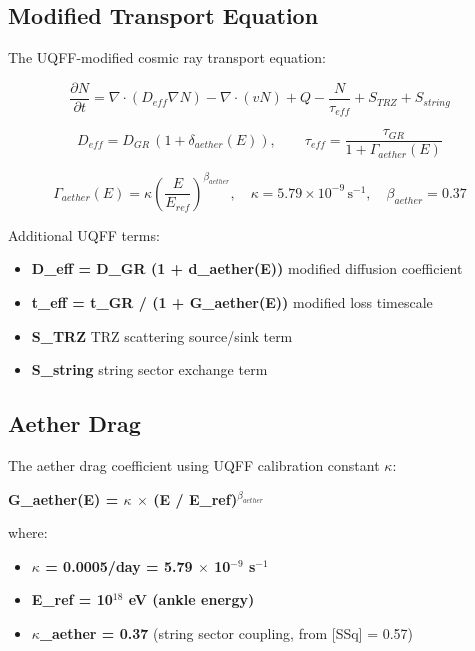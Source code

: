 \documentclass[12pt,a4paper]{article}
\begin{document}
\subsection{Modified Transport Equation}

The UQFF-modified cosmic ray transport equation:

\begin{equation}
\frac{\partial N}{\partial t} = \nabla\cdot(D_{eff}\nabla N) - \nabla\cdot(v N) + Q - \frac{N}{\tau_{eff}} + S_{TRZ} + S_{string}
\end{equation}

\begin{equation}
D_{eff} = D_{GR}\,(1 + \delta_{aether}(E)), \qquad \tau_{eff} = \frac{\tau_{GR}}{1 + \Gamma_{aether}(E)}
\end{equation}

\begin{equation}
\Gamma_{aether}(E) = \kappa \left(\frac{E}{E_{ref}}\right)^{\beta_{aether}},\quad \kappa = 5.79\times10^{-9}\,\mathrm{s}^{-1},\quad \beta_{aether} = 0.37
\end{equation}

Additional UQFF terms:

\begin{itemize}
  \item \textbf{D\_eff = D\_GR  (1 + d\_aether(E))}  modified diffusion coefficient
  \item \textbf{t\_eff = t\_GR / (1 + G\_aether(E))}  modified loss timescale
  \item \textbf{S\_TRZ}  TRZ scattering source/sink term
  \item \textbf{S\_string}  string sector exchange term
\end{itemize}

\subsection{Aether Drag}

The aether drag coefficient using UQFF calibration constant $\kappa$:

\textbf{G\_aether(E) = $\kappa$ $\times$ (E / E\_ref)$^{\beta_{aether}}$}

where:

\begin{itemize}
  \item \textbf{$\kappa$ = 0.0005/day = 5.79 $\times$ 10$^{-9}$ s$^{-1}$}
  \item \textbf{E\_ref = 10$^{18}$ eV (ankle energy)}
  \item \textbf{$\kappa$\_aether = 0.37} (string sector coupling, from [SSq] = 0.57)
\end{itemize}
\end{document}
